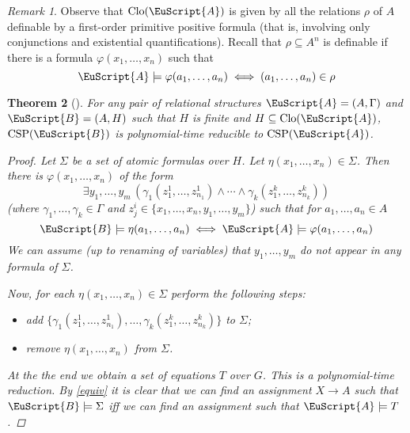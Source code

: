 \documentclass{amsart}
\theoremstyle{plain}
\newtheorem{theorem}{Theorem}[section]
\theoremstyle{definition}
\theoremstyle{remark}
\newtheorem{remark}[theorem]{Remark}
\def\phi{\varphi}
\def\E{\exists}
\DeclareMathOperator{\Clo}{Clo}
\DeclareMathOperator{\CSP}{CSP}
\begin{document}
\begin{remark}
    Observe that $\Clo(\EuScript{A})$ is given by all the relations $\rho$ of $A$ definable by a first-order primitive positive formula
    (that is, involving only conjunctions and existential quantifications). 
    Recall that $\rho \subseteq A^n$ is definable if there is a formula $\phi(x_1, \ldots, x_n)$ such that 
    \begin{equation*}
        \EuScript{A} \models \phi(a_1, \ldots, a_n) \iff (a_1, \ldots, a_n) \in \rho
    \end{equation*}
\end{remark}

\begin{theorem}[\cite{jeavons}]
    For any pair of relational structures $\EuScript{A}=(A,\Gamma)$ 
    and $\EuScript{B}=(A, H)$ 
    such that $H$ is {finite} and $H \subseteq \Clo(\EuScript{A})$, $\CSP(\EuScript{B})$ is polynomial-time reducible to $\CSP(\EuScript{A})$.
    \begin{proof}
        Let $\Sigma$ be a set of atomic formulas over $H$.  
        Let $\eta(x_1, \ldots, x_n) \in \Sigma$. 
        Then there is $\phi(x_1, \ldots, x_n)$ of the form 
        \begin{equation*}
            \E y_1, \ldots, y_m \,( \gamma_1(z^{1}_{1}, \ldots, z^{1}_{n_1}) \land \cdots \land \gamma_k(z^{k}_{1}, \ldots, z^{k}_{n_k}))
        \end{equation*} 
        (where $\gamma_1, \ldots, \gamma_k \in \Gamma$ and $z^{i}_{j} \in \{x_1, \ldots, x_n, y_1, \ldots, y_m\}$)
        such that for $a_1, \ldots, a_n \in A$ 
        \begin{equation}
            \label{equiv}
            \EuScript{B} \models \eta(a_1, \ldots, a_n)  
            \iff \EuScript{A} \models \phi(a_1, \ldots, a_n)
        \end{equation}
        We can assume (up to renaming of variables) that $y_1, \ldots, y_m$ do not appear in any formula of $\Sigma$.  

        Now, for each $\eta(x_1, \ldots, x_n) \in \Sigma$ perform the following steps: 
        \begin{itemize}
            \item add $\{\gamma_1(z^{1}_{1}, \ldots, z^{1}_{n_1}), \ldots, \gamma_k(z^{k}_{1}, \ldots, z^{k}_{n_k})\}$ to $\Sigma$; 
            \item remove $\eta(x_1, \ldots, x_n)$ from $\Sigma$. 
        \end{itemize}
        At the the end we obtain a set of equations $T$ over $G$. 
        {This is a polynomial-time reduction. 
        } 
        By \eqref{equiv} it is clear that we can find an assignment $X \to A$ such that $\EuScript{B} \models \Sigma$ iff we can find an assignment such that $\EuScript{A} \models T$.
    \end{proof} 
\end{theorem}
\end{document}
